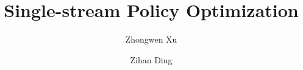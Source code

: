 \documentclass[11pt, letterpaper]{arxiv}
\title{Single-stream Policy Optimization}
\author[1*]{Zhongwen Xu}
\author[1*]{Zihan Ding}
\affil[]{Tencent}
\affil[*]{Equal contribution.}
\theoremstyle{plain}
\theoremstyle{definition}
\theoremstyle{remark}
\begin{document}
\maketitle















\newpage
\appendix
\onecolumn

\end{document}
